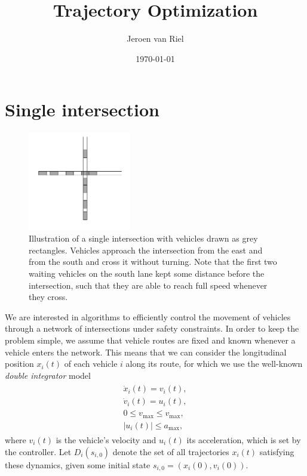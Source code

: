 \documentclass[a4paper]{article}
\author{Jeroen van Riel}
\date{\monthyeardate\today}
\title{Trajectory Optimization}
\theoremstyle{definition}
\theoremstyle{plain}
\begin{document}
\section*{Single intersection}

\begin{figure}
  \centering
  \includegraphics[width=0.4\textwidth]{figures/single_intersection_example.png}
  \caption{Illustration of a single intersection with vehicles drawn as grey
    rectangles. Vehicles approach the intersection from the east and from the
    south and cross it without turning. Note that the first two waiting vehicles
    on the south lane kept some distance before the intersection, such that they
    are able to reach full speed whenever they
    cross.}\label{fig:intersection_illustration}
\end{figure}

We are interested in algorithms to efficiently control the movement of vehicles
through a network of intersections under safety constraints. In order to keep
the problem simple, we assume that vehicle routes are fixed and known whenever a
vehicle enters the network. This means that we can consider the longitudinal
position $x_{i}(t)$ of each vehicle $i$ along its route, for which we use the
well-known \textit{double integrator} model
\begin{gather}
  \label{eq:vehicle_dynamics}
\begin{aligned}
  \dot{x}_{i}(t) = v_{i}(t) , \\
  \dot{v}_{i}(t) = u_{i}(t)  , \\
  0 \leq v_{\max} \leq v_{\max} , \\
  |u_{i}(t) | \leq a_{\max} ,
\end{aligned}
\end{gather}
where $v_{i}(t)$ is the vehicle's velocity and $u_{i}(t)$ its acceleration,
which is set by the controller. Let $D_{i}(s_{i,0})$ denote the set of all
trajectories $x_{i}(t)$ satisfying these
dynamics, given some initial state $s_{i,0} = (x_{i}(0), v_{i}(0))$.
\end{document}
